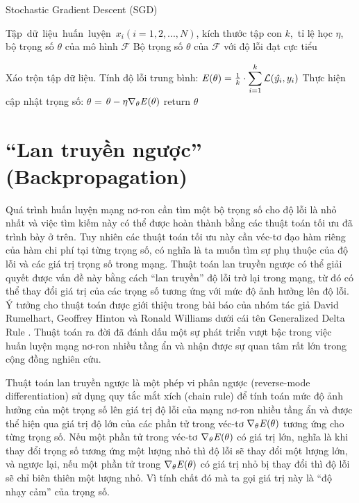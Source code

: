 \begin{algorithm}
	\caption{Stochastic Gradient Descent (SGD)} \label{alg:SGD}
	\begin{algorithmic}[1]
		\renewcommand{\algorithmicrequire}{\textbf{Đầu vào:}}
		\renewcommand{\algorithmicensure}{\textbf{Đầu ra:}}
		\algnewcommand{}
		\algnewcommand\Operation{\item[\algorithmicoperation]}

		\Require Tập dữ liệu huấn luyện $x_i (i = 1, 2, ..., N)$, kích thước tập con $k$, tỉ lệ học $\eta$, bộ trọng số $\theta$ của mô hình $\mathcal{F}$
		\Ensure Bộ trọng số $\theta$ của $\mathcal{F}$ với độ lỗi đạt cực tiểu

		\Operation
			\State Xáo trộn tập dữ liệu.
				\State Tính độ lỗi trung bình: $\mathbf{\it{E}(\theta)} = \frac{1}{k}\cdot \displaystyle\sum_{i=1}^{k}\mathcal{L}(\hat{y_i}, y_i)$
				\State Thực hiện cập nhật trọng số: $\theta$ = $\theta - \eta \nabla_{\theta} \mathbf{\it{E}(\theta)}$
			\EndFor
		\EndWhile
		\State return $\theta$
	\end{algorithmic}
\end{algorithm}

\section{``Lan truyền ngược'' (Backpropagation)}

Quá trình huấn luyện mạng nơ-ron cần tìm một bộ trọng số cho độ lỗi là nhỏ nhất và việc tìm kiếm này có thể được hoàn thành bằng các thuật toán tối ưu đã trình bày ở trên. Tuy nhiên các thuật toán tối ưu này cần véc-tơ đạo hàm riêng của hàm chi phí tại từng trọng số, có nghĩa là ta muốn tìm sự phụ thuộc của độ lỗi và các giá trị trọng số trong mạng. Thuật toán lan truyền ngược có thể giải quyết được vấn đề này bằng cách ``lan truyền'' độ lỗi trở lại trong mạng, từ đó có thể thay đổi giá trị của các trọng số tương ứng với mức độ ảnh hưởng lên độ lỗi. Ý tưởng cho thuật toán được giới thiệu trong bài báo của nhóm tác giả David Rumelhart, Geoffrey Hinton và Ronald Williams dưới cái tên Generalized Delta Rule \cite{rumelhart1986learning}. Thuật toán ra đời đã đánh dấu một sự phát triển vượt bậc trong việc huấn luyện mạng nơ-ron nhiều tầng ẩn và nhận được sự quan tâm rất lớn trong cộng đồng nghiên cứu.

Thuật toán lan truyền ngược là một phép vi phân ngược (reverse-mode differentiation) sử dụng quy tắc mắt xích (chain rule) để tính toán mức độ ảnh hưởng của một trọng số lên giá trị độ lỗi của mạng nơ-ron nhiều tầng ẩn và được thể hiện qua giá trị độ lớn của các phần tử trong véc-tơ $\nabla_\theta \mathbf{\it{E}(\theta)}$ tương ứng cho từng trọng số. Nếu một phần tử trong véc-tơ $\nabla_\theta \mathbf{\it{E}(\theta)}$ có giá trị lớn, nghĩa là khi thay đổi trọng số tương ứng một lượng nhỏ thì độ lỗi sẽ thay đổi một lượng lớn, và ngược lại, nếu một phần tử trong $\nabla_\theta \mathbf{\it{E}(\theta)}$ có giá trị nhỏ bị thay đổi thì độ lỗi sẽ chỉ biên thiên một lượng nhỏ. Vì tính chất đó mà ta gọi giá trị này là ``độ nhạy cảm'' của trọng số.

